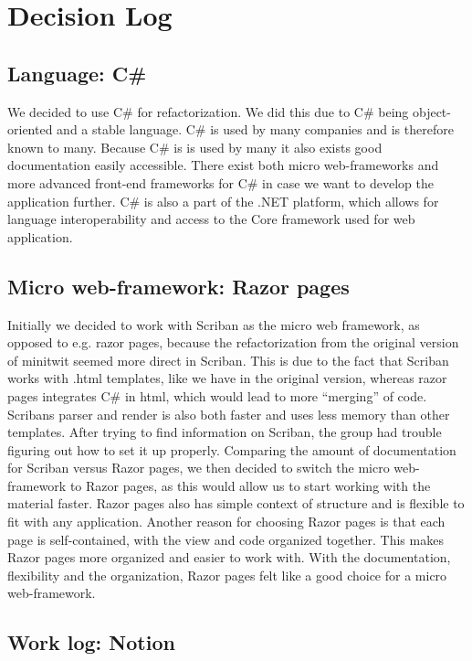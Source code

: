 \section{Decision Log}
\label{appendix:decision-log}
\subsection{Language: C\#}

We decided to use C\# for refactorization. We did this due to C\# being object-oriented and a stable language. C\# is used by many companies and is therefore known to many. Because C\# is is used by many it also exists good documentation easily accessible.
There exist both micro web-frameworks and more advanced front-end frameworks for C\# in case we want to develop the application further.
C\# is also a part of the .NET platform, which allows for language interoperability and access to the Core framework used for web application.

\subsection{Micro web-framework: Razor pages}

Initially we decided to work with Scriban as the micro web framework, as opposed to e.g. razor pages, because the refactorization from the original version of minitwit seemed more direct in Scriban. This is due to the fact that Scriban works with .html templates, like we have in the original version, whereas razor pages integrates C\# in html, which would lead to more “merging” of code.
Scribans parser and render is also both faster and uses less memory than other templates.
After trying to find information on Scriban, the group had trouble figuring out how to set it up properly. Comparing the amount of documentation for Scriban versus Razor pages, we then decided to switch the micro web-framework to Razor pages, as this would allow us to start working with the material faster.
Razor pages also has simple context of structure and is flexible to fit with any application. Another reason for choosing Razor pages is that each page is self-contained, with the view and code organized together.  This makes Razor pages more organized and easier to work with. With the documentation, flexibility and the organization, Razor pages felt like a good choice for a micro web-framework.

\subsection{Work log: Notion}


